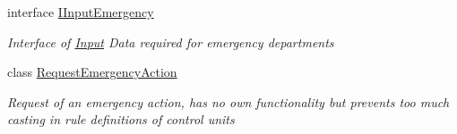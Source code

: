 \begin{DoxyCompactItemize}
interface \hyperlink{interface_general_health_care_elements_1_1_department_models_1_1_emergency_1_1_i_input_emergency}{I\+Input\+Emergency}
\begin{DoxyCompactList}\small\item\em Interface of \hyperlink{namespace_general_health_care_elements_1_1_input}{Input} Data required for emergency departments \end{DoxyCompactList}\item 
class \hyperlink{class_general_health_care_elements_1_1_department_models_1_1_emergency_1_1_request_emergency_action}{Request\+Emergency\+Action}
\begin{DoxyCompactList}\small\item\em Request of an emergency action, has no own functionality but prevents too much casting in rule definitions of control units \end{DoxyCompactList}\end{DoxyCompactItemize}
